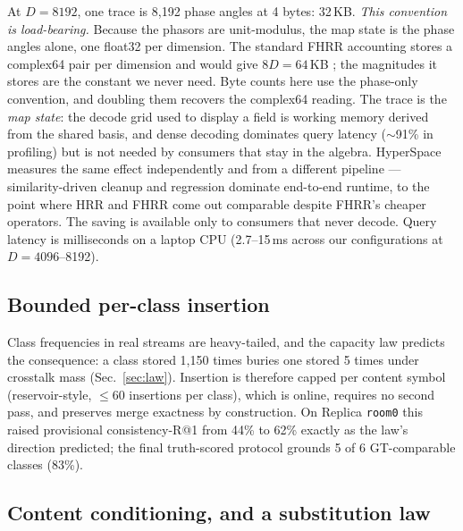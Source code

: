 \documentclass[conference]{IEEEtran}
\begin{document}
At $D=8192$, one trace is 8{,}192 phase angles at 4 bytes: 32\,KB.
\emph{This convention is load-bearing.} Because the phasors are
unit-modulus, the map state is the phase angles alone, one float32 per
dimension. The standard FHRR accounting stores a complex64 pair per
dimension and would give $8D = 64$\,KB \cite{snyder2026hyperspace}; the
magnitudes it stores are the constant we never need. Byte counts here use
the phase-only convention, and doubling them recovers the complex64
reading. The trace is the \emph{map state}: the decode grid used to
display a field is working memory derived from the shared basis, and
dense decoding dominates query latency ($\sim$91\% in profiling) but is
not needed by consumers that stay in the algebra. HyperSpace
\cite{snyder2026hyperspace} measures the same effect independently and
from a different pipeline --- similarity-driven cleanup and regression
dominate end-to-end runtime, to the point where HRR and FHRR come out
comparable despite FHRR's cheaper operators. The saving is available only
to consumers that never decode. Query latency is milliseconds on a laptop
CPU (2.7--15\,ms across our configurations at $D=4096$--8192).

\subsection{Bounded per-class insertion}
\label{sec:bounded}

Class frequencies in real streams are heavy-tailed, and the capacity law
predicts the consequence: a class stored 1{,}150 times buries one stored
5 times under crosstalk mass (Sec.~\ref{sec:law}). Insertion is therefore
capped per content symbol (reservoir-style, $\le 60$ insertions per
class), which is online, requires no second pass, and preserves merge
exactness by construction. On Replica \texttt{room0} this raised
provisional consistency-R@1 from 44\% to 62\% exactly as the law's
direction predicted; the final truth-scored protocol grounds 5 of 6
GT-comparable classes (83\%).

\subsection{Content conditioning, and a substitution law}
\label{sec:conditioning}
\end{document}
